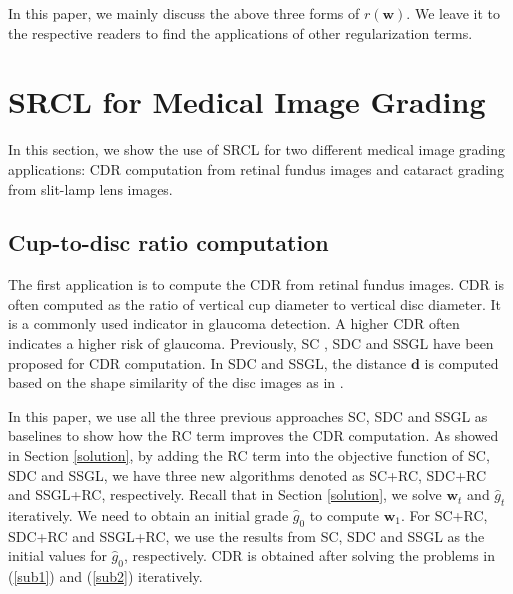 \documentclass[journal]{IEEEtran}
\begin{document}
 In this paper, we mainly discuss the above three forms of $r(\textbf{w})$.   We leave it to the respective readers to find the applications of other  regularization terms.


\section{SRCL for Medical Image Grading} \label{application}
In this section, we show the use of SRCL for two different medical image grading applications: CDR computation from retinal fundus images and cataract grading from slit-lamp lens images.
\subsection{Cup-to-disc ratio computation}
The first application is to compute the CDR from retinal fundus images. CDR is often computed as the ratio of vertical cup diameter to vertical disc diameter.
 It is a commonly used indicator in glaucoma detection.
  A higher CDR often indicates a higher risk of glaucoma. Previously, %
SC \cite{sparsecoding}, SDC \cite{CJ15}  and SSGL\cite{Cheng:17BOE} have been proposed for CDR computation. In SDC and SSGL,  the distance   $\textbf{d}$ is computed  based on  the shape similarity of the disc images as in \cite{CJ15}.

   In this paper, we use all the three previous approaches SC, SDC and SSGL as baselines to show how the RC term improves the CDR computation. As showed in Section \ref{solution}, by adding the RC term into the objective function of SC, SDC and SSGL,  we have three new algorithms  denoted as SC+RC, SDC+RC and SSGL+RC, respectively.   Recall that in Section \ref{solution}, we solve $\textbf{w}_t$ and $\hat{g}_t$ iteratively. We need to obtain an initial grade $\hat{g}_0$ to compute $\textbf{w}_1$. For SC+RC, SDC+RC and SSGL+RC, we use the results from SC, SDC and SSGL as the initial values for $\hat{g}_0$, respectively.
    CDR is obtained after  solving the problems in (\ref{sub1}) and (\ref{sub2}) iteratively.
\end{document}
